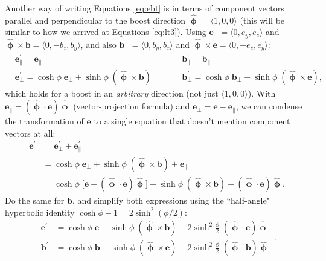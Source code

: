 \documentclass[12pt]{article}
\renewcommand{\vv}[1]{\mathbf{#1}}
\newcommand{\hatphi}{\bm{\hat{\upphi}}}
\begin{document}
Another way of writing Equations \ref{eq:ebt} is in terms of component vectors parallel and perpendicular to the boost direction $\hatphi = \langle 1, 0, 0 \rangle$ (this will be similar to how we arrived at Equations \ref{eq:lt3}). Using ${\vv e_\perp = \langle 0, e_y, e_z \rangle}$ and $\hatphi \times \vv b = \langle 0, -b_z, b_y \rangle$, and also $\vv b_\perp = \langle 0, b_y, b_z \rangle$ and $\hatphi \times \vv e = \langle 0, -e_z, e_y \rangle$:
\begin{equation*}
\begin{aligned}
& \vv e^\prime_\parallel = \vv e_\parallel  \qquad \qquad& & \vv b^\prime_\parallel = \vv b_\parallel  \\
& \vv e^\prime_\perp =  \cosh{\phi} \; \vv e_\perp  +  \sinh{\phi} \; ( \hatphi \times \vv b )   \qquad& & \vv b^\prime_\perp = \cosh{\phi} \; \vv b_\perp  - \sinh{\phi} \; ( \hatphi \times \vv e ) ,
\end{aligned}
\end{equation*}
which holds for a boost in an \emph{arbitrary} direction (not just $\langle 1, 0, 0 \rangle$). With $\vv e_\parallel = (\hatphi \cdot \vv e) \hatphi$ (vector-projection formula) and $\vv e_\perp = \vv e - \vv e_\parallel$, we can condense the transformation of $\vv e$ to a single equation that doesn't mention component vectors at all:
\begin{equation*}
\begin{split}
\vv e^\prime &= \vv e^\prime_\perp  + \vv e^\prime_\parallel \\
&= \cosh{\phi} \; \vv e_\perp  +  \sinh{\phi} \; ( \hatphi \times \vv b ) + \vv e_\parallel \\
&= \cosh{\phi} \; \big[ \vv e - (\hatphi \cdot \vv e) \hatphi \big] + \sinh{\phi} \; (\hatphi \times \vv b) + (\hatphi \cdot \vv e) \hatphi .
\end{split}
\end{equation*}
Do the same for $\vv b$, and simplify both expressions using the ``half-angle" hyperbolic identity $\cosh{\phi} - 1 = 2 \sinh^2{(\phi/2)}$:
\begin{equation}\label{eq:ebr}
\boxed{
\begin{aligned}
\vv e^\prime &= \cosh{\phi} \; \vv e + \sinh{\phi} \; (\hatphi \times \vv b) - 2 \sinh^2 \frac{\phi}{2} \; (\hatphi \cdot \vv e) \hatphi \\[4pt]
\vv b^\prime &= \cosh{\phi} \; \vv b - \sinh{\phi} \; (\hatphi \times \vv e) - 2 \sinh^2 \frac{\phi}{2} \; (\hatphi \cdot \vv b) \hatphi 
\end{aligned}
} \, .
\end{equation}
\end{document}
